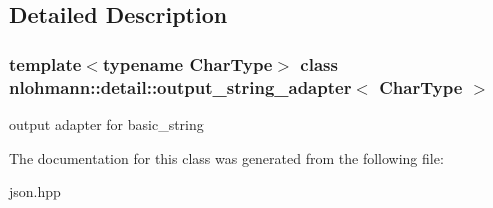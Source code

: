 \subsection{Detailed Description}
\subsubsection*{template$<$typename Char\+Type$>$\newline
class nlohmann\+::detail\+::output\+\_\+string\+\_\+adapter$<$ Char\+Type $>$}

output adapter for basic\+\_\+string 

The documentation for this class was generated from the following file\+:\begin{DoxyCompactItemize}
\item 
json.\+hpp\end{DoxyCompactItemize}
